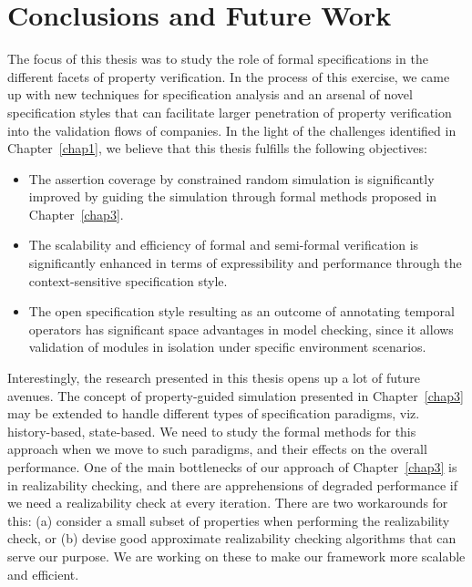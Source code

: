 \chapter{Conclusions and Future Work} \label{chap9}
The focus of this thesis was to study the role of formal specifications in 
the different facets of property verification. In the process of this 
exercise, we came up with new techniques for specification analysis and 
an arsenal of novel specification styles that can facilitate larger 
penetration of property verification into the validation flows of companies. 
In the light of the challenges identified in Chapter~\ref{chap1}, we believe 
that this thesis fulfills the following objectives:

\begin{itemize}

\item The assertion coverage by constrained random
    simulation is significantly improved by guiding the simulation through 
	formal methods proposed in Chapter~\ref{chap3}.

\item The scalability and efficiency of formal and
    semi-formal verification is significantly enhanced in terms of 
	expressibility and performance through the context-sensitive 
	specification style. 

\item The open specification style resulting as an 
	outcome of annotating temporal operators has significant space 
	advantages in model checking, since it allows validation of modules 
	in isolation under specific environment scenarios.

\end{itemize}

\noindent
Interestingly, the research presented in this thesis opens up a lot of 
future avenues. The concept of property-guided simulation presented in 
Chapter~\ref{chap3} may be extended to handle different types of 
specification paradigms, viz. history-based, state-based. We need to study 
the formal methods for this approach when we move to such paradigms, 
and their effects on the overall performance. One of the main bottlenecks 
of our approach of Chapter~\ref{chap3} is in realizability checking, 
and there are apprehensions of degraded performance if we need 
a realizability check at every iteration. There are two workarounds for 
this: (a) consider a small subset of properties when performing the 
realizability check, or (b) devise good approximate realizability 
checking algorithms that can serve our purpose. We are working on these 
to make our framework more scalable and efficient. 

